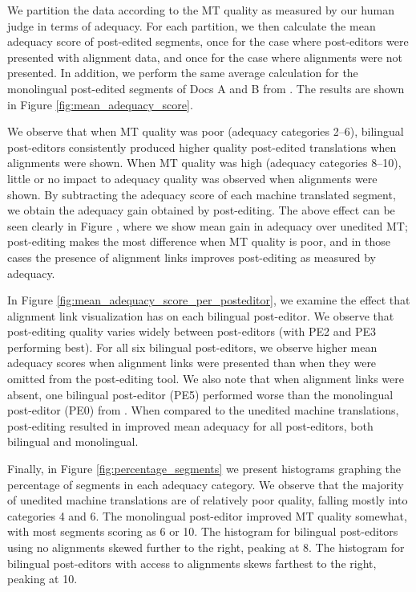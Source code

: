 We partition the data according to the MT quality as measured by our human judge in terms of adequacy.
%
For each partition, we then calculate the mean adequacy score of post-edited segments, once for the case where post-editors were presented with alignment data, and once for the case where alignments were not presented.
%
In addition, we perform the same average calculation for the monolingual post-edited segments of Docs A and B from \citet{2014_WMT_Schwartz_etal}.
%
The results are shown in Figure \ref{fig:mean_adequacy_score}.








We observe that when MT quality was poor (adequacy categories 2--6), bilingual post-editors consistently produced higher quality post-edited translations when alignments were shown.
%
When MT quality was high (adequacy categories 8--10), little or no impact to adequacy quality was observed when alignments were shown. 
%
By subtracting the adequacy score of each machine translated segment, we obtain the adequacy gain obtained by post-editing.
%
The above effect can be seen clearly in Figure , where we show mean gain in adequacy over unedited MT;
%
post-editing makes the most difference when MT quality is poor, and in those cases the presence of alignment links improves post-editing as measured by adequacy.


In Figure \ref{fig:mean_adequacy_score_per_posteditor}, we examine the effect that alignment link visualization has on each bilingual post-editor.
%
We observe that post-editing quality varies widely between post-editors (with PE2 and PE3 performing best).
%
For all six bilingual post-editors, we observe higher mean adequacy scores when alignment links were presented than when they were omitted from the post-editing tool.
%
We also note that when alignment links were absent, one bilingual post-editor (PE5) performed worse than the monolingual post-editor (PE0) from \citet{2014_WMT_Schwartz_etal}.
%
When compared to the unedited machine translations, post-editing resulted in improved mean adequacy for all post-editors, both bilingual and monolingual.

Finally, in Figure \ref{fig:percentage_segments} we present histograms graphing the percentage of segments in each adequacy category.
%
We observe that the majority of unedited machine translations are of relatively poor quality, falling mostly into categories 4 and 6. %
%
The monolingual post-editor improved MT quality somewhat, with most segments scoring as 6 or 10.
%
The histogram for bilingual post-editors using no alignments skewed further to the right, peaking at 8.
%
The histogram for bilingual post-editors with access to alignments skews farthest to the right, peaking at 10.



